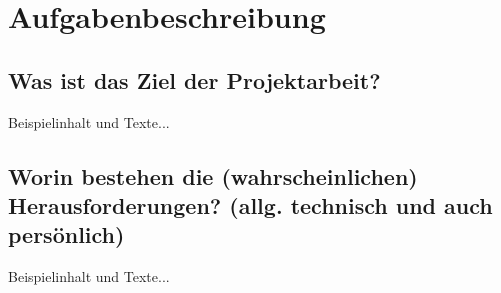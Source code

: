 

\section{Aufgabenbeschreibung}



\subsection{Was ist das Ziel der Projektarbeit?}
Beispielinhalt und Texte...

\subsection{Worin bestehen die (wahrscheinlichen) Herausforderungen? (allg. technisch und auch persönlich)}
Beispielinhalt und Texte...

